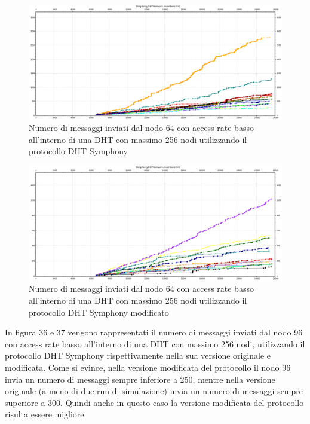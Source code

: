 \documentclass[	
	DIV=calc,
	paper=a4,
	fontsize=11pt,
	onecolumn
]{scrartcl} %
\begin{document}
	\begin{figure}[H]
		\centering
		\includegraphics[scale=0.35]	{SymphonyDHT/plots/MessagesSentByEveryNode/256_Nodes_SlowAccess/SymphonyDHT_256Nodes_SlowAccess_Node64.png}
		\caption{Numero di messaggi inviati dal nodo 64 con access rate basso all'interno di una DHT con massimo 256 nodi utilizzando il protocollo DHT Symphony}
		\label{Figura 34}
	\end{figure}
	\begin{figure}[H]
		\centering
		\includegraphics[scale=0.35]	{SymphonyDHTMod/plots/MessagesSentByEveryNode/256_Nodes_SlowAccess/SymphonyDHTMod_256Nodes_SlowAccess_Node64.png}
		\caption{Numero di messaggi inviati dal nodo 64 con access rate basso all'interno di una DHT con massimo 256 nodi utilizzando il protocollo DHT Symphony modificato}
		\label{Figura 35}
	\end{figure}		
	
	In figura 36 e 37 vengono rappresentati il numero di messaggi inviati dal nodo 96 con access rate basso all'interno di una DHT con massimo 256 nodi, utilizzando il protocollo DHT Symphony rispettivamente nella sua versione originale e modificata. Come si evince, nella versione modificata del protocollo il nodo 96 invia un numero di messaggi sempre inferiore a 250, mentre nella versione originale (a meno di due run di simulazione) invia un numero di messaggi sempre superiore a 300. Quindi anche in questo caso la versione modificata del protocollo risulta essere migliore.
	
\end{document}
